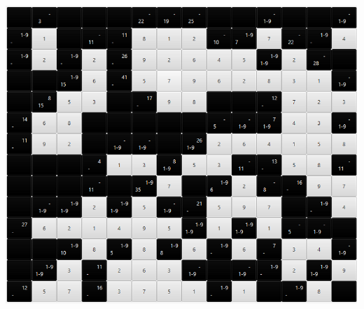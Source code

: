 \documentclass[conference]{IEEEtran}
\begin{document}
 \newline

\centering\includegraphics[scale=0.9]{kakuroResuelto.png}\newline\newline\newline\newline\newline\newline\newline\newline\newline\newline\newline\newline\newline\newline\newline\newline\newline\newline\newline\newline\newline\newline\newline\newline\newline\newline\newline\newline\newline\newline\newline\newline\newline\newline\newline\newline\newline\newline\newline\newline\newline\newline\newline\newline\
\end{document}
